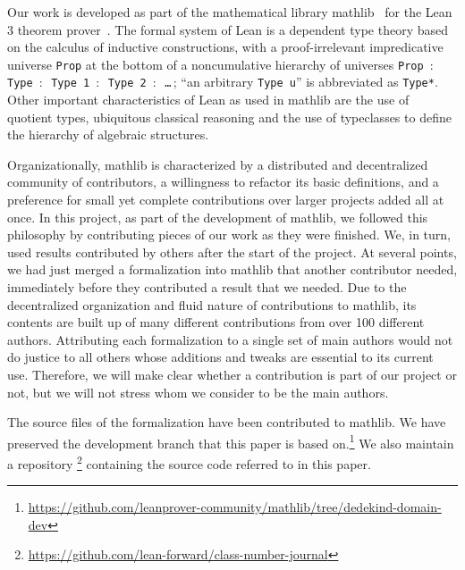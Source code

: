 \documentclass[sn-mathphys]{sn-jnl}%
\newcommand{\lean}[1]{\texttt{#1}\xspace}
\newcommand{\mathlib}{\textsf{mathlib}\xspace}
\begin{document}
Our work is developed as part of the mathematical library \mathlib~\cite{mathlib} for the Lean 3 theorem prover~\cite{lean-prover}.
The formal system of Lean is a dependent type theory based on the calculus of inductive constructions,
with a proof-irrelevant impredicative universe \lean{Prop} at the bottom of a noncumulative hierarchy of universes \lean{Prop $:$ Type $:$ Type 1 $:$ \mbox{Type 2} $:$ \dots}\,; ``an arbitrary \lean{Type u}'' is abbreviated as \lean{Type*}.
Other important characteristics of Lean as used in \mathlib are the use of quotient types, ubiquitous classical reasoning and the use of typeclasses to define the hierarchy of algebraic structures.

Organizationally, \mathlib is characterized by a distributed and decentralized community of contributors, a willingness to refactor its basic definitions, and a preference for small yet complete contributions over larger projects added all at once.
In this project, as part of the development of \mathlib, we followed this philosophy by contributing pieces of our work as they were finished.
We, in turn, used results contributed by others after the start of the project.
At several points, we had just merged a formalization into \mathlib that another contributor needed,
immediately before they contributed a result that we needed.
Due to the decentralized organization and fluid nature of contributions to \mathlib, its contents are built up of many different contributions from over 100 different authors.
Attributing each formalization to a single set of main authors would not do justice to all others whose additions and tweaks are essential to its current use. Therefore, we will make clear whether a contribution is part of our project or not, but we will not stress whom we consider to be the main authors.

The source files of the formalization have been contributed to \mathlib.
We have preserved the development branch that this paper is based on.\footnote{\url{https://github.com/leanprover-community/mathlib/tree/dedekind-domain-dev}}
We also maintain a
repository%
\footnote{\url{https://github.com/lean-forward/class-number-journal}}
containing the source code referred to in this paper.
\end{document}
